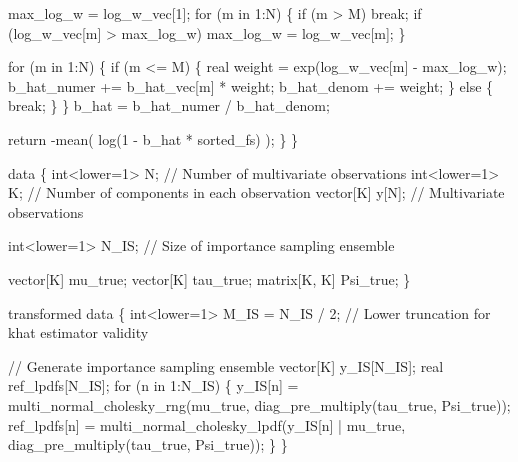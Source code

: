 \documentclass[
  letterpaper,
  DIV=11,
  numbers=noendperiod]{scrartcl}
\newenvironment{Shaded}{\begin{snugshade}}{\end{snugshade}}
\newcommand{\CommentTok}[1]{\textcolor[rgb]{0.37,0.37,0.37}{#1}}
\newcommand{\ControlFlowTok}[1]{\textcolor[rgb]{0.00,0.23,0.31}{#1}}
\newcommand{\DataTypeTok}[1]{\textcolor[rgb]{0.68,0.00,0.00}{#1}}
\newcommand{\DecValTok}[1]{\textcolor[rgb]{0.68,0.00,0.00}{#1}}
\newcommand{\KeywordTok}[1]{\textcolor[rgb]{0.00,0.23,0.31}{#1}}
\newcommand{\NormalTok}[1]{\textcolor[rgb]{0.00,0.23,0.31}{#1}}
\begin{document}
\begin{codelisting}
\begin{Shaded}
\begin{Highlighting}[]
\NormalTok{    max\_log\_w = log\_w\_vec[}\DecValTok{1}\NormalTok{];}
    \ControlFlowTok{for}\NormalTok{ (m }\ControlFlowTok{in} \DecValTok{1}\NormalTok{:N) \{}
      \ControlFlowTok{if}\NormalTok{ (m \textgreater{} M) }\ControlFlowTok{break}\NormalTok{;}
      \ControlFlowTok{if}\NormalTok{ (log\_w\_vec[m] \textgreater{} max\_log\_w) max\_log\_w = log\_w\_vec[m];}
\NormalTok{    \}}

    \ControlFlowTok{for}\NormalTok{ (m }\ControlFlowTok{in} \DecValTok{1}\NormalTok{:N) \{}
      \ControlFlowTok{if}\NormalTok{ (m \textless{}= M) \{}
        \DataTypeTok{real}\NormalTok{ weight = exp(log\_w\_vec[m] {-} max\_log\_w);}
\NormalTok{        b\_hat\_numer += b\_hat\_vec[m] * weight;}
\NormalTok{        b\_hat\_denom += weight;}
\NormalTok{      \} }\ControlFlowTok{else}\NormalTok{ \{}
        \ControlFlowTok{break}\NormalTok{;}
\NormalTok{      \}}
\NormalTok{    \}}
\NormalTok{    b\_hat = b\_hat\_numer / b\_hat\_denom;}

    \ControlFlowTok{return}\NormalTok{ {-}mean( log(}\DecValTok{1}\NormalTok{ {-} b\_hat * sorted\_fs) );}
\NormalTok{  \}}
\NormalTok{\}}

\KeywordTok{data}\NormalTok{ \{}
  \DataTypeTok{int}\NormalTok{\textless{}}\KeywordTok{lower}\NormalTok{=}\DecValTok{1}\NormalTok{\textgreater{} N; }\CommentTok{// Number of multivariate observations}
  \DataTypeTok{int}\NormalTok{\textless{}}\KeywordTok{lower}\NormalTok{=}\DecValTok{1}\NormalTok{\textgreater{} K; }\CommentTok{// Number of components in each observation}
  \DataTypeTok{vector}\NormalTok{[K] y[N]; }\CommentTok{// Multivariate observations}

  \DataTypeTok{int}\NormalTok{\textless{}}\KeywordTok{lower}\NormalTok{=}\DecValTok{1}\NormalTok{\textgreater{} N\_IS; }\CommentTok{// Size of importance sampling ensemble}

  \DataTypeTok{vector}\NormalTok{[K] mu\_true;}
  \DataTypeTok{vector}\NormalTok{[K] tau\_true;}
  \DataTypeTok{matrix}\NormalTok{[K, K] Psi\_true;}
\NormalTok{\}}

\KeywordTok{transformed data}\NormalTok{ \{}
  \DataTypeTok{int}\NormalTok{\textless{}}\KeywordTok{lower}\NormalTok{=}\DecValTok{1}\NormalTok{\textgreater{} M\_IS = N\_IS / }\DecValTok{2}\NormalTok{; }\CommentTok{// Lower truncation for khat estimator validity}

  \CommentTok{// Generate importance sampling ensemble}
  \DataTypeTok{vector}\NormalTok{[K] y\_IS[N\_IS];}
  \DataTypeTok{real}\NormalTok{ ref\_lpdfs[N\_IS];}
  \ControlFlowTok{for}\NormalTok{ (n }\ControlFlowTok{in} \DecValTok{1}\NormalTok{:N\_IS) \{}
\NormalTok{    y\_IS[n]}
\NormalTok{      = multi\_normal\_cholesky\_rng(mu\_true,}
\NormalTok{                                  diag\_pre\_multiply(tau\_true, Psi\_true));}
\NormalTok{    ref\_lpdfs[n]}
\NormalTok{      = multi\_normal\_cholesky\_lpdf(y\_IS[n] |}
\NormalTok{                                   mu\_true,}
\NormalTok{                                   diag\_pre\_multiply(tau\_true, Psi\_true));}
\NormalTok{  \}}
\NormalTok{\}}


\end{Highlighting}
\end{Shaded}
\end{codelisting}
\end{document}

